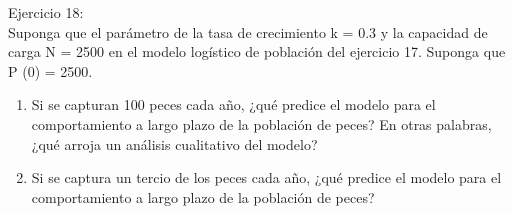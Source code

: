 \documentclass{article}
\begin{document}
Ejercicio 18: \\ 
Suponga que el parámetro de la tasa de crecimiento k = 0.3 y la capacidad de carga 
N = 2500 en el modelo 
logístico de población del ejercicio 17. Suponga que P (0) = 2500.
\begin{enumerate}
    \item  Si se capturan 100 peces cada año, ¿qué predice el modelo para el 
    comportamiento a largo plazo de la población de peces? En otras palabras, 
    ¿qué arroja un análisis cualitativo del modelo?
    \item Si se captura un tercio de los peces cada año, ¿qué predice el modelo para 
    el comportamiento a largo plazo de la población de peces?
\end{enumerate}
\end{document}
